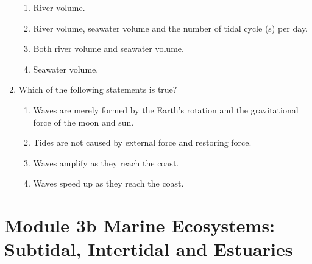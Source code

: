 \documentclass{report}
\begin{document}
\begin{enumerate}
    \begin{enumerate}
        \item   River volume. 
        \item   River volume, seawater volume and the number of tidal cycle (s) per day.
        \item   Both river volume and seawater volume. 
        \item   Seawater volume. 
    \end{enumerate}
    \item Which of the following statements is true?
    \begin{enumerate}
        \item   Waves are merely formed by the Earth’s rotation and the gravitational force of the moon and sun.
        \item   Tides are not caused by external force and restoring force. 
        \item   Waves amplify as they reach the coast. 
        \item   Waves speed up as they reach the coast. 
    \end{enumerate}
\end{enumerate}


\chapter{Module 3b Marine Ecosystems: Subtidal, Intertidal and Estuaries}
\end{document}
